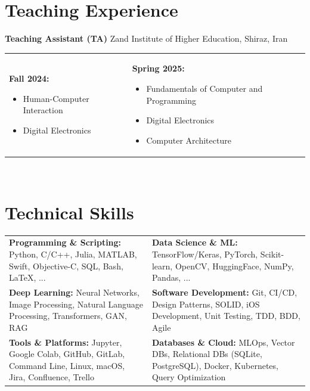 \documentclass[letter,10pt]{article}
\newcommand{\customsquare}{\raisebox{0.25ex}{\scalebox{0.45}{$\blacksquare$}}}
\begin{document}
\section*{Teaching Experience}
\textbf{Teaching Assistant (TA)} \hfill Zand Institute of Higher Education, Shiraz, Iran \\ [5pt]
\begin{tabularx}{\textwidth}{@{}X X@{}}
    \customsquare\hspace{2mm}\textbf{Fall 2024:} 
    \begin{itemize}
        \item Human-Computer Interaction
        \item Digital Electronics
    \end{itemize}
    &
    \customsquare\hspace{2mm}\textbf{Spring 2025:} 
    \begin{itemize}
        \item Fundamentals of Computer and Programming
        \item Digital Electronics
        \item Computer Architecture
    \end{itemize}
\end{tabularx} \\ [-20pt]

\section*{Technical Skills}
\begin{tabularx}{\textwidth}{@{}X@{\hspace{5mm}}X@{}}
\customsquare\hspace{2mm}\textbf{Programming \& Scripting:} Python, C/C++, Julia, MATLAB, Swift, Objective-C, SQL, Bash, LaTeX, ... & 
\customsquare\hspace{2mm}\textbf{Data Science \& ML:} TensorFlow/Keras, PyTorch, Scikit-learn, OpenCV, HuggingFace, NumPy, Pandas, ... \\
\vspace{-1mm}
\customsquare\hspace{2mm}\textbf{Deep Learning:} Neural Networks, Image Processing, Natural Language Processing, Transformers, GAN, RAG &
\vspace{-1mm}
\customsquare\hspace{2mm}\textbf{Software Development:} Git, CI/CD, Design Patterns, SOLID, iOS Development, Unit Testing, TDD, BDD, Agile \\
\vspace{-1mm}
\customsquare\hspace{2mm}\textbf{Tools \& Platforms:} Jupyter, Google Colab, GitHub, GitLab, Command Line, Linux, macOS, Jira, Confluence, Trello &
\vspace{-1mm}
\customsquare\hspace{2mm}\textbf{Databases \& Cloud:} MLOps, Vector DBs, Relational DBs (SQLite, PostgreSQL), Docker, Kubernetes, Query Optimization
\end{tabularx}
\end{document}
